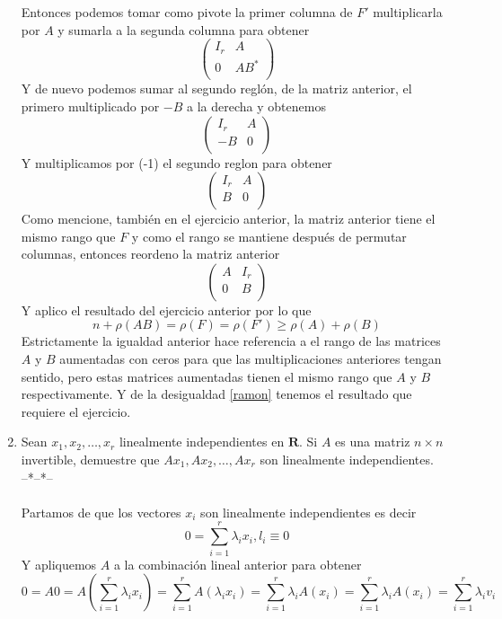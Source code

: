 \documentclass[letter]{memoir} %
\begin{document}
\begin{enumerate}
Entonces podemos tomar como pivote la primer columna de $F'$ multiplicarla por $A$ y sumarla a la segunda columna para obtener  
\[
 \left( \begin{array}{ccc}
I_r & A \\
0 & AB^*  \\ 
\end{array}
\right)
\]
Y de nuevo podemos sumar al segundo reglón, de la matriz anterior, el primero multiplicado por $-B$ a la derecha y obtenemos
\[
 \left( \begin{array}{ccc}
I_r & A \\
-B & 0  \\ 
\end{array}
\right)
\]
Y multiplicamos por (-1) el segundo reglon para obtener
\[
 \left( \begin{array}{ccc}
I_r & A \\
B & 0  \\ 
\end{array}
\right)
\]
Como mencione, también en el ejercicio anterior, la matriz anterior tiene el mismo rango que $F$ y como el rango se mantiene después de permutar columnas, entonces reordeno la matriz anterior 
\[
 \left( \begin{array}{ccc}
A& I_r \\
0 & B  \\ 
\end{array}
\right)
\]
Y aplico el resultado del ejercicio anterior por lo que 
\begin{equation}\label{ramon}
	n +\rho(AB) = \rho(F)= \rho(F') \geq \rho(A) + \rho(B) 
\end{equation}
Estrictamente la igualdad anterior hace referencia a el rango de las matrices $A$ y $B$ aumentadas con ceros para que las multiplicaciones anteriores tengan sentido, pero estas matrices aumentadas tienen el mismo rango que $A$ y $B$ respectivamente.
Y de la desigualdad \ref{ramon} tenemos el resultado que requiere el ejercicio.\\
\item Sean $x_1,x_2, \dots, x_r$ linealmente independientes en $\mathbf{R}$. Si $A$ es una matriz $n\times n$ invertible, demuestre que $Ax_1, Ax_2, \dots, Ax_r$ son linealmente independientes.\\
--*--*--\\\\
Partamos de que los vectores $x_i$ son linealmente independientes es decir 
\[0 = \sum_{i=1}^r\lambda_ix_i , l_i\equiv 0 \]
Y apliquemos $A$ a la combinación lineal anterior para obtener 
\[0 = A0 = A(\sum_{i=1}^r\lambda_i x_i )=
\sum_{i=1}^rA(\lambda_ix_i) = \sum_{i=1}^r\lambda_iA(x_i) =\sum_{i=1}^r\lambda_iA(x_i) = \sum_{i=1}^r\lambda_iv_i  
\]


\end{enumerate}
\end{document}
